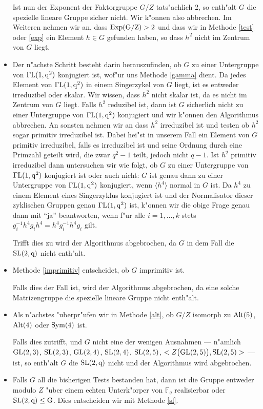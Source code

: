 \documentclass[a4paper,11pt]{article}
\theoremstyle{bla}
\begin{document}
\begin{itemize}
  Ist nun der Exponent der Faktorgruppe $G/Z$ tats"achlich 2, so enth"alt $G$ die spezielle lineare Gruppe sicher nicht. Wir k"onnen also abbrechen. Im Weiteren nehmen wir an, dass $\rm{Exp}(G/Z) > 2$ und dass wir in Methode \ref{test} oder \ref{exp} ein Element $h \in G$ gefunden haben, so dass $h^2$ nicht im Zentrum von $G$ liegt.

  \item Der n"achste Schritt besteht darin herauszufinden, ob $G$ zu einer Untergruppe von $\Gamma\rm{L}(1,q^2)$ konjugiert ist, wof"ur uns Methode \ref{gamma} dient.
  Da jedes Element von $\Gamma\rm{L}(1,q^2)$ in einem Singerzykel von $G$ liegt, ist es entweder irreduzibel oder skalar. Wir wissen, dass $h^2$ nicht skalar ist, da es nicht im Zentrum von $G$ liegt. Falls $h^2$ reduzibel ist, dann ist $G$ sicherlich nicht zu einer Untergruppe von $\Gamma\rm{L}(1,q^2)$ konjugiert und wir k"onnen den Algorithmus abbrechen. An sonsten nehmen wir an dass $h^2$ irreduzibel ist und testen ob $h^2$ sogar primitiv irreduzibel ist. Dabei hei"st in unserem Fall ein Element von $G$ primitiv irreduzibel, falls es irreduzibel ist und seine Ordnung durch eine Primzahl geteilt wird, die zwar $q^2-1$ teilt, jedoch nicht $q-1$. Ist $h^2$ primitiv irreduzibel dann untersuchen wir wie folgt, ob $G$ zu einer Untergruppe von $\Gamma\rm{L}(1,q^2)$ konjugiert ist oder auch nicht:
  $G$ ist genau dann zu einer Untergruppe von $\Gamma\rm{L}(1,q^2)$ konjugiert, wenn $\langle h^4 \rangle$ normal in $G$ ist. Da $h^4$ zu einem Element eines Singerzyklus konjugiert ist und der Normalisator dieser zyklischen Gruppen genau $\Gamma\rm{L}(1,q^2)$ ist, k"onnen wir die obige Frage genau dann mit "`ja"' beantworten, wenn f"ur alle $i = 1, \dots, k$ stets $g_i^{-1} h^4 g_i h^4 = h^4 g_i^{-1} h^4 g_i$ gilt.

  Trifft dies zu wird der Algorithmus abgebrochen, da $G$ in dem Fall die $\rm{SL}(2,q)$ nicht enth"alt.
 
  \item Methode \ref{imprimitiv} entscheidet, ob $G$ imprimitiv ist.

  Falls dies der Fall ist, wird der Algorithmus abgebrochen, da eine solche Matrizengruppe die spezielle lineare Gruppe nicht enth"alt.

  \item Als n"achstes "uberpr"ufen wir in Methode \ref{alt}, ob $G/Z$ isomorph zu $\rm{Alt}(5)$, $\rm{Alt}(4)$ oder $\rm{Sym}(4)$ ist.

  Falls dies zutrifft, und $G$ nicht eine der wenigen Ausnahmen --- n"amlich $\rm{GL}(2,3)$, $\rm{SL}(2,3)$, $\rm{GL}(2,4)$, $\rm{SL}(2,4)$, $\rm{SL}(2,5)$, $<Z\bigl(\rm{GL}(2,5)\bigr),\rm{SL}(2,5)>$ --- ist, so enth"alt $G$ die $\rm{SL}(2,q)$ nicht und der Algorithmus wird abgebrochen.

  \item Falls $G$ all die bisherigen Tests bestanden hat, dann ist die Gruppe entweder modulo $Z$ "uber einem echten Unterk"orper von $\mathbb{F}_{q}$ realisierbar oder $\rm{SL}(2,q) \leq G$. Dies entscheiden wir mit Methode \ref{sl}.

\end{itemize}
\end{document}

